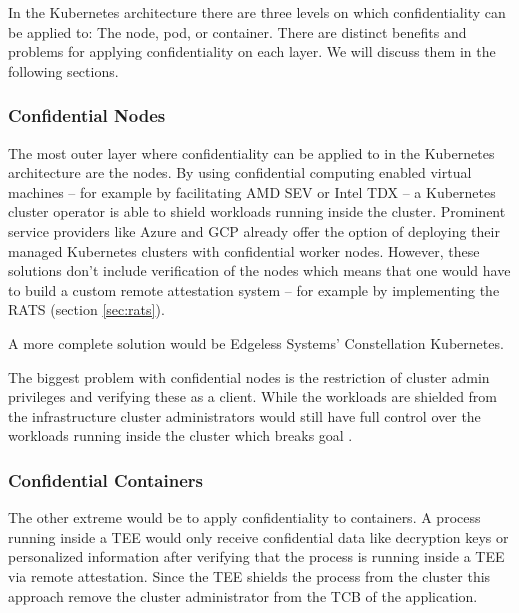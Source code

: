 
In the Kubernetes architecture there are three levels on which confidentiality
can be applied to: The node, pod, or container. There are distinct benefits and
problems for applying confidentiality on each layer. We will discuss them in the
following sections.

\subsubsection{Confidential Nodes}

The most outer layer where confidentiality can be applied to in the Kubernetes
architecture are the nodes. By using confidential computing enabled virtual
machines -- for example by facilitating AMD SEV or Intel TDX -- a Kubernetes
cluster operator is able to shield workloads running inside the cluster.
Prominent service providers like Azure and GCP already offer the option of
deploying their managed Kubernetes clusters with confidential worker nodes.
However, these solutions don't include verification of the nodes which means
that one would have to build a custom remote attestation system -- for example
by implementing the RATS (section \ref{sec:rats}).

A more complete solution would be Edgeless Systems' Constellation Kubernetes.

The biggest problem with confidential nodes is the restriction of cluster admin
privileges and verifying these as a client. While the workloads are shielded
from the infrastructure cluster administrators would still have full control
over the workloads running inside the cluster which breaks goal .

\subsubsection{Confidential Containers}

The other extreme would be to apply confidentiality to containers. A process
running inside a TEE would only receive confidential data like decryption keys
or personalized information after verifying that the process is running inside a
TEE via remote attestation. Since the TEE shields the process from the cluster
this approach remove the cluster administrator from the TCB of the application.

